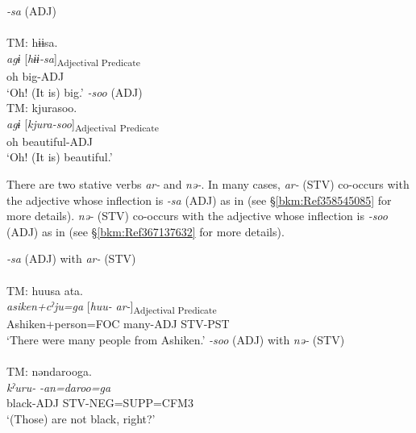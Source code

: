 \ea\label{ex:4.10}
\ea\label{ex:4.10a} \textit{-sa} (ADJ)\hfill\relax[Co: 120415\_01.txt]\\
\\
 {TM:}   {hɨɨsa.}\\
   {\itshape agɨ}  {[\textit{hɨɨ-sa}]\textsubscript{Adjectival Predicate}}\\
   {oh}  {big-ADJ}\\
   \glt{} ‘Oh! (It is) big.’
 \ex \textit{{}-soo} (ADJ)\hfill\relax[El: 130823]\\
 {TM:}   {kjurasoo.}\\
   {\itshape agɨ}  {[\textit{kjura-soo}]\textsubscript{Adjectival} \textsubscript{Predicate}}\\
   {oh}  {beautiful-ADJ}\\
   \glt{} ‘Oh! (It is) beautiful.’\\
\z
\z

There are two stative verbs \textit{ar-} and \textit{nə-}. In many cases, \textit{ar-} (STV) co-occurs with the adjective whose inflection is \textit{{}-sa} (ADJ) as in  (see §\ref{bkm:Ref358545085} for more details). \textit{nə-} (STV) co-occurs with the adjective whose inflection is \textit{{}-soo} (ADJ) as in  (see §\ref{bkm:Ref367137632} for more details).

\ea 
\ea\label{ex:4.11a} \textit{{}-sa} (ADJ) with \textit{ar-} (STV)\hfill\relax[Co: 120415\_00.txt]\\
 \\
 {TM:}   {huusa}  {ata.}\\
   {{\itshape asiken+cˀju=ga}}  {[\textit{huu-}}  {\textit{ar{}-}]\textsubscript{Adjectival Predicate}}\\
   {{Ashiken+person=FOC}}  {many-ADJ}  {STV-PST}\\
   \glt{} ‘There were many people from Ashiken.’
\ex \label{ex:4.11b} \textit{{}-soo} (ADJ) with \textit{nə-} (STV)\hfill\relax[Co: 111113\_01.txt]\\
 \\
 {{TM:}}   {nəndarooga.}\\
        \textit{kˀuru-}  \textit{-an=daroo=ga}\\
        {black-ADJ}  {STV-NEG=SUPP=CFM3}\\
 \glt{} ‘(Those) are not black, right?’
\z
\z
 
